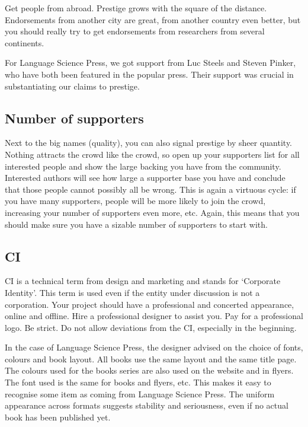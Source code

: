 \documentclass[nonflat,modfonts,output=book] {langsci/langscibook}
\begin{document}
Get people from abroad. Prestige grows with the square of the distance. Endorsements from another city are great, from another country even better, but you should really try to get endorsements from researchers from several continents. 

For Language Science Press, we got support from Luc Steels and Steven Pinker, who have both been featured in the popular press. Their support was crucial in substantiating our claims to prestige. 

\subsection{Number of supporters}
Next to the big names (quality), you can also signal prestige by sheer quantity. Nothing attracts the crowd like the crowd, so open up your supporters list for all interested people and show the large backing you have from the community. Interested authors will see how large a supporter base you have and conclude that those people cannot possibly all be wrong. This is again a virtuous cycle: if you have many supporters, people will be more likely to join the crowd, increasing your number of supporters even more, etc. Again, this means that you should make sure you have a sizable number of supporters to start with. 


 
\subsection{CI}\label{sec:CI}
CI is a technical term from design and marketing and stands for `Corporate Identity'. This term is used even if the entity under discussion is not a corporation. Your project should have a professional and concerted appearance, online and offline. Hire a professional designer to assist you. Pay for a professional logo. Be strict. Do not allow deviations from the CI, especially in the beginning.

In the case of Language Science Press, the designer advised on the choice of fonts, colours and book layout. All books use the same layout and the same title page. The colours used for the books series are also used on the website and in flyers. The font used is the same for books and flyers, etc. This makes it easy to recognise some item as coming from Language Science Press. The uniform appearance across formats suggests stability and seriousness, even if no actual book has been published yet. 
\end{document}

